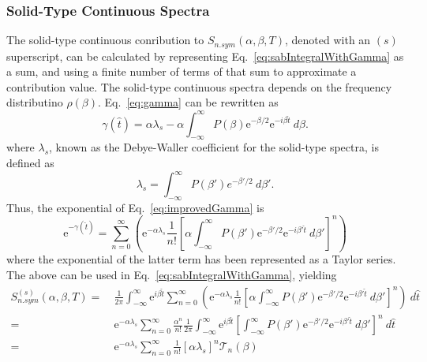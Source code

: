 \documentclass[../master.tex]{subfiles}
\begin{document}
			\subsubsection{Solid-Type Continuous Spectra}
                                The solid-type continuous conribution to $S_{n.sym}(\alpha,\beta,T)$, denoted with an $(s)$ superscript, can be calculated by representing Eq.~\ref{eq:sabIntegralWithGamma} as a sum, and using a finite number of terms of that sum to approximate a contribution value. The solid-type continuous spectra depends on the frequency distributino $\rho(\beta)$.
				Eq.~\ref{eq:gamma} can be rewritten as 
				\begin{equation} 
					\gamma(\hat{t})=\alpha\lambda_s-\alpha\int_{-\infty}^{\infty}P(\beta)\mathrm{e}^{-\beta/2}\mathrm{e}^{-i\beta\hat{t}}~d\beta.\label{eq:improvedGamma}
				\end{equation}
				where $\lambda_s$, known as the Debye-Waller coefficient for the solid-type spectra, is defined as 
				\begin{equation}
					\lambda_s = \int_{-\infty}^\infty P(\beta')e^{-\beta'/2}~d\beta'.
				\end{equation}
				Thus, the exponential of Eq.~\ref{eq:improvedGamma} is
				\begin{equation} 
					\mathrm{e}^{-\gamma(\hat{t})}=\sum_{n=0}^\infty\left(\mathrm{e}^{-\alpha\lambda_s}\frac{1}{n!}\left[\alpha\int_{-\infty}^{\infty}P(\beta')\mathrm{e}^{-\beta'/2}\mathrm{e}^{-i\beta'\hat{t}}~d\beta'\right]^n\right)
				\end{equation}
				where the exponential of the latter term has been represented as a Taylor series. The above can be used in Eq.~\ref{eq:sabIntegralWithGamma}, yielding
				\begin{align}
                                       S^{(s)}_{n.sym}(\alpha,\beta,T)=~&\frac{1}{2\pi}\int_{-\infty}^{\infty}\mathrm{e}^{i\beta\hat{t}}\sum_{n=0}^\infty\left(\mathrm{e}^{-\alpha\lambda_s}\frac{1}{n!}\left[\alpha\int_{-\infty}^{\infty}P(\beta')\mathrm{e}^{-\beta'/2}\mathrm{e}^{-i\beta'\hat{t}}~d\beta'\right]^n\right)~d\hat{t}\\
					=~&\mathrm{e}^{-\alpha\lambda_s}\sum_{n=0}^\infty\frac{\alpha^n}{n!}\frac{1}{2\pi}\int_{-\infty}^{\infty}\mathrm{e}^{i\beta\hat{t}}\left[\int_{-\infty}^{\infty}P(\beta')\mathrm{e}^{-\beta'/2}\mathrm{e}^{-i\beta'\hat{t}}~d\beta'\right]^n~d\hat{t}\\
					=~&\mathrm{e}^{-\alpha\lambda_{s}}\sum_{n=0}^{\infty}\frac{1}{n!}\left[\alpha\lambda_{s}\right]^{n}\mathcal{T}_{n}(\beta)\label{eq:sumToGetToContinSab}
				\end{align}
\end{document}
